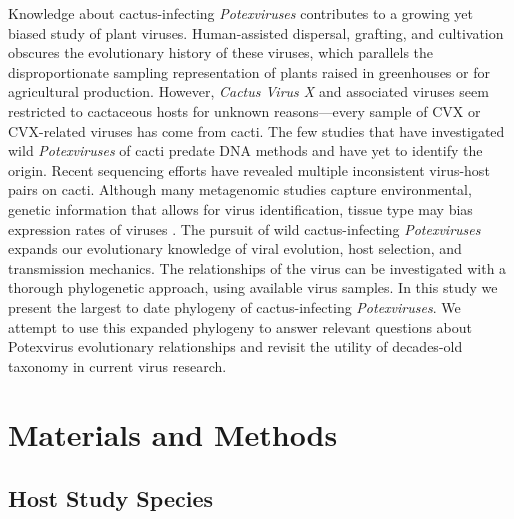 \documentclass[fleqn,10pt,lineno]{wlpeerj}
\begin{document}
Knowledge about cactus-infecting \textit{Potexviruses} contributes to a growing yet biased study of plant viruses. 
Human-assisted dispersal, grafting, and cultivation obscures the evolutionary history of these viruses, which parallels the disproportionate sampling representation of plants raised in greenhouses or for agricultural production. 
However, \textit{Cactus Virus X} and associated viruses seem restricted to cactaceous hosts for unknown reasons---every sample of CVX or CVX-related viruses has come from cacti.
The few studies that have investigated wild \textit{Potexviruses} of cacti predate DNA methods and have yet to identify the origin.
Recent sequencing efforts have revealed multiple inconsistent virus-host pairs on cacti.
Although many metagenomic studies capture environmental, genetic information that allows for virus identification, tissue type may bias expression rates of viruses \citep{lacroix2016methodological}.
The pursuit of wild cactus-infecting \textit{Potexviruses} expands our evolutionary knowledge of viral evolution, host selection, and transmission mechanics. 
The relationships of the virus can be investigated with a thorough phylogenetic approach, using available virus samples. 
In this study we present the largest to date phylogeny of cactus-infecting \textit{Potexviruses}.
We attempt to use this expanded phylogeny to answer relevant questions about Potexvirus evolutionary relationships and revisit the utility of decades-old taxonomy in current virus research. 


\section*{Materials and Methods}

\subsection*{Host Study Species}
\end{document}

